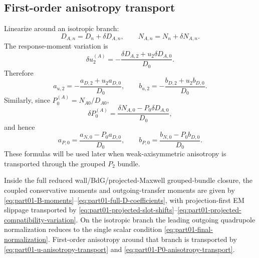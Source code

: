 \subsection{First-order anisotropy transport}
\label{subsec:part01-anisotropy-transport}

Linearize around an isotropic branch:
\begin{equation}
D_{A,n}=D_n+\delta D_{A,n},
\qquad
N_{A,n}=N_n+\delta N_{A,n}.
\end{equation}
The response-moment variation is
\begin{equation}
\delta u_2^{(A)}
=
-\frac{\delta D_{A,2}+u_2\delta D_{A,0}}{D_0}.
\end{equation}
Therefore
\begin{equation}
\label{eq:part01-u-anisotropy-transport}
\boxed{
a_{u,2}=-\frac{a_{D,2}+u_2a_{D,0}}{D_0},
\qquad
b_{u,2}=-\frac{b_{D,2}+u_2b_{D,0}}{D_0}}.
\end{equation}
Similarly, since \(P_0^{(A)}=N_{A0}/D_{A0}\),
\begin{equation}
\delta P_0^{(A)}
=
\frac{\delta N_{A,0}-P_0\delta D_{A,0}}{D_0},
\end{equation}
and hence
\begin{equation}
\label{eq:part01-P0-anisotropy-transport}
\boxed{
a_{P,0}=\frac{a_{N,0}-P_0a_{D,0}}{D_0},
\qquad
b_{P,0}=\frac{b_{N,0}-P_0b_{D,0}}{D_0}}.
\end{equation}
These formulas will be used later when weak-axisymmetric anisotropy is transported through the grouped \(P_2\) bundle.

\begin{theorem}
\label{thm:part01-full-grouped-bundle}
Inside the full reduced wall/BdG/projected-Maxwell grouped-bundle closure, the coupled conservative moments and outgoing-transfer moments are given by \eqref{eq:part01-B-moments}--\eqref{eq:part01-full-D-coefficients}, with projection-first EM slippage transported by \eqref{eq:part01-projected-slot-shifts}--\eqref{eq:part01-projected-compatibility-variation}.  On the isotropic branch the leading outgoing quadrupole normalization reduces to the single scalar condition \eqref{eq:part01-final-normalization}.  First-order anisotropy around that branch is transported by \eqref{eq:part01-u-anisotropy-transport} and \eqref{eq:part01-P0-anisotropy-transport}.
\end{theorem}

